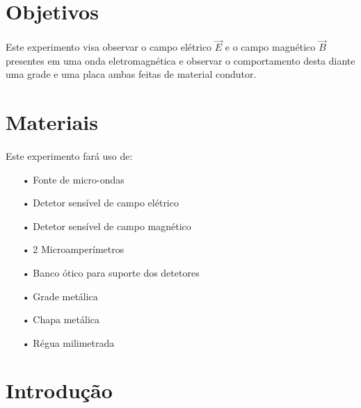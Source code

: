 \documentclass[a4paper,11pt]{article}
\begin{document}


\tableofcontents

\newpage

\section{Objetivos}
\paragraph{} Este experimento visa observar o campo elétrico $ \vec{E} $ e o campo magnético $ \vec{B} $ presentes em uma onda eletromagnética e observar o comportamento desta diante uma grade e uma placa ambas feitas de material condutor. 

\section{Materiais}
\paragraph{} Este experimento fará uso de:
\begin{itemize}
\item[•] Fonte de micro-ondas
\item[•] Detetor sensível de campo elétrico
\item[•] Detetor sensível de campo magnético
\item[•] 2 Microamperímetros
\item[•] Banco ótico para suporte dos detetores
\item[•] Grade metálica
\item[•] Chapa metálica
\item[•] Régua milimetrada 
\end{itemize}
\newpage

\section{Introdução}
\end{document}
